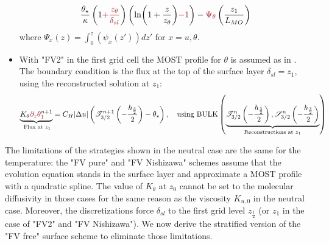 \begin{itemize}
\begin{equation}
\begin{aligned}
			\frac{\theta_\star}{\kappa}
			\left(1\emphase{+\frac{z_\theta}
					{\delta_{sl}}}\right)
		\left(\ln(1+\frac{z}{z_\theta})\emphase{-1}\right)
		- \emphase{\Psi_\theta}\left(\frac{z_1}{L_{MO}}\right)
		\end{aligned}
		\end{equation}
		where $\Psi_x(z) = \int_0^z (\psi_x(z'))dz'$
		for $x=u,\theta$.
	\item With "FV2" in the first grid cell
		the MOST profile for $\theta$ is assumed as in
		\cite{nishizawa_surface_2018}.
		The boundary condition is the flux at the top of the
		surface layer $\delta_{sl}=z_1$,
		using the reconstructed solution at $z_1$:
		\begin{equation}
			\underbrace{K_\theta
			\emphase{\partial_z \theta}^{n+1}_\emphase{1}}_{\text{
				Flux at
			} z_1} =
			C_H|\Delta u|\left(
			{\cal T}_{3/2}^{n+1}
			\left(-\frac{h_\frac{3}{2}}{2}\right)
			- \theta_s\right),
			~~~ \text{using } {\rm BULK}
			\left(\underbrace{{\cal T}_{3/2}^{n}
			\left(-\frac{h_\frac{3}{2}}{2}\right),
			{\cal S}_{3/2}^{n}
			\left(-\frac{h_\frac{3}{2}}{2}\right)}_{
			\text{Reconstructions at } z_1 }\right)
		\end{equation}
\end{itemize}
The limitations of the strategies shown in the neutral case are the
same for the temperature: the "FV pure" and "FV Nishizawa" schemes
assume that the evolution equation stands
in the surface layer and approximate a MOST profile with
a quadratic spline.
The value of $K_\theta$ at $z_0$ cannot be set to the molecular
diffusivity in those cases for the same reason as the
viscosity $K_{u,0}$ in the neutral case.
%
Moreover, the discretizations force $\delta_{sl}$ to the first
grid level $z_{\frac{1}{2}}$ (or $z_1$ in the case of "FV2" and
"FV Nishizawa").
We now derive the stratified version of the "FV free" surface scheme
to eliminate those limitations.
